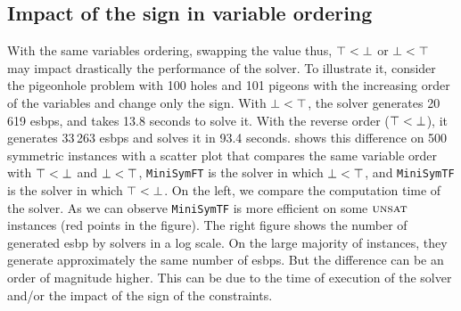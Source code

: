 \subsection{Impact of the sign in variable ordering}
With the same variables ordering, swapping the value thus, $\top < \bot$ or $\bot < \top$
may impact drastically the performance of the solver.
To illustrate it, consider the pigeonhole problem with 100 holes and 101 pigeons with 
the increasing order of the variables and change only the sign.
With  $\bot < \top$, the solver generates 20\,619 esbps, and takes 13.8 seconds to solve it.
With the reverse order ($\top < \bot$), it generates 33\,263 esbps and solves it in 93.4 seconds.
 shows this difference on 500 symmetric instances with
a scatter plot that compares the same variable order with $\top < \bot$ and $\bot < \top$,
 \texttt{MiniSymFT} is the solver in which $\bot < \top$, and  \texttt{MiniSymTF} is the solver in which $\top < \bot$.
On the left, we compare the computation time of the solver. 
As we can observe \texttt{MiniSymTF} is more efficient on some $\textsc{unsat}$ instances (red points in the figure).
The right figure shows the number of generated esbp by solvers in a log scale. On the large majority of instances, they generate 
approximately the same number of esbps. But the difference can be an order of magnitude higher. This can be due to the time of
execution of the solver and/or the impact of the sign of the constraints.

